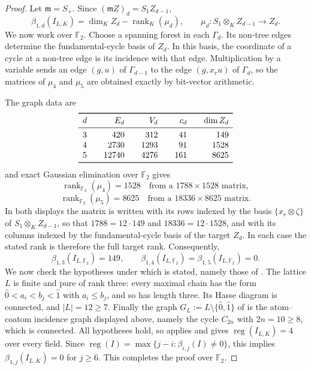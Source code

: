\documentclass[11pt]{amsart}
\begin{document}
\begin{proof}
Let $\mathfrak m=S_+$. Since
$(\mathfrak mZ)_d=S_1Z_{d-1}$,
\[
  \beta_{1,d}(I_{L,K})
  =
  \dim_K Z_d-\operatorname{rank}_K(\mu_d),
  \qquad
  \mu_d:S_1\otimes_K Z_{d-1}\longrightarrow Z_d.
\]
We now work over $\mathbb F_2$. Choose a spanning forest in each
$\Gamma_d$. Its non-tree edges determine the fundamental-cycle basis
of $Z_d$. In this basis, the coordinate of a cycle at a non-tree edge
is its incidence with that edge. Multiplication by a variable sends
an edge $(g,u)$ of $\Gamma_{d-1}$ to the edge $(g,x_ru)$ of
$\Gamma_d$, so the matrices of $\mu_4$ and $\mu_5$ are obtained
exactly by bit-vector arithmetic.

The graph data are
\[
\begin{array}{c@{\qquad}r@{\qquad}r@{\qquad}r@{\qquad}r}
\toprule
 d & E_d & V_d & c_d & \dim Z_d\\
\midrule
 3 &   420 &  312 &  41 &  149\\
 4 &  2730 & 1293 &  91 & 1528\\
 5 & 12740 & 4276 & 161 & 8625\\
\bottomrule
\end{array}
\]
and exact Gaussian elimination over $\mathbb F_2$ gives
\[
  \operatorname{rank}_{\mathbb F_2}(\mu_4)=1528
  \quad\text{from a }1788\times1528\text{ matrix},
\]
\[
  \operatorname{rank}_{\mathbb F_2}(\mu_5)=8625
  \quad\text{from a }18336\times8625\text{ matrix}.
\]
In both displays the matrix is written with its rows indexed by the basis
$\{x_r\otimes\zeta\}$ of $S_1\otimes_KZ_{d-1}$, so that
$1788=12\cdot149$ and $18336=12\cdot1528$, and with its columns indexed
by the fundamental-cycle basis of the target $Z_d$. In each case the
stated rank is therefore the full target rank. Consequently,
\[
  \beta_{1,3}(I_{L,\mathbb F_2})=149,
  \qquad
  \beta_{1,4}(I_{L,\mathbb F_2})
  =\beta_{1,5}(I_{L,\mathbb F_2})=0.
\]
We now check the hypotheses under which \cite[Lemma~2.8]{HSF} is stated,
namely those of \cite[Lemma~2.6]{HSF}. The lattice $L$ is finite and
pure of rank three: every maximal chain has the form
$\widehat0<a_i<b_j<\widehat1$ with $a_i\le b_j$, and so has length
three. Its Hasse diagram is connected, and $|L|=12\ge7$. Finally the
graph $G_L:=L\setminus\{\widehat0,\widehat1\}$ of
\cite[Section~2]{HSF} is the atom--coatom incidence graph displayed
above, namely the cycle $C_{2n}$ with $2n=10\ge8$, which is connected.
All hypotheses hold, so
\cite[Lemma~2.8]{HSF} applies and gives $\operatorname{reg}(I_{L,K})=4$
over every field. Since
$\operatorname{reg}(I)=\max\{j-i:\beta_{i,j}(I)\ne0\}$, this implies
$\beta_{1,j}(I_{L,K})=0$ for $j\ge6$. This completes the proof over
$\mathbb F_2$.


\end{proof}
\end{document}
